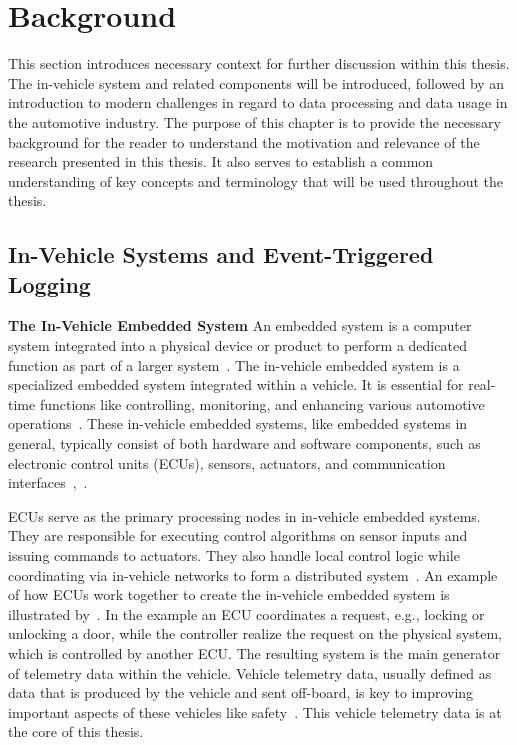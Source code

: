 \chapter{Background}
\label{chap:background}

This section introduces necessary context for further discussion within this thesis. The in-vehicle system and related components will be introduced, followed by an introduction to modern challenges in regard to data processing and data usage in the automotive industry. The purpose of this chapter is to provide the necessary background for the reader to understand the motivation and relevance of the research presented in this thesis. It also serves to establish a common understanding of key concepts and terminology that will be used throughout the thesis.

\section{In-Vehicle Systems and Event-Triggered Logging}

\textbf{The In-Vehicle Embedded System} An embedded system is a computer system integrated into a physical device or product to perform a dedicated function as part of a larger system~\cite[pp.~vii--x,~1--3]{Lee2017}. The in-vehicle embedded system is a specialized embedded system integrated within a vehicle. It is essential for real-time functions like controlling, monitoring, and enhancing various automotive operations~\cite[pp.~1-1--1-5]{Navet2009}. These in-vehicle embedded systems, like embedded systems in general, typically consist of both hardware and software components, such as electronic control units (ECUs), sensors, actuators, and communication interfaces~\cite[pp.~3--4]{Lee2017},~\cite[pp.~1-3--1-10]{Navet2009}. 

ECUs serve as the primary processing nodes in in-vehicle embedded systems. They are responsible for executing control algorithms on sensor inputs and issuing commands to actuators. They also handle local control logic while coordinating via in-vehicle networks to form a distributed system~\cite[pp.~1-8--1-19]{Navet2009}. An example of how ECUs work together to create the in-vehicle embedded system is illustrated by~\cite[pp.~1-8--1-9]{Navet2009}. In the example an ECU coordinates a request, e.g., locking or unlocking a door, while the controller realize the request on the physical system, which is controlled by another ECU\@. The resulting system is the main generator of telemetry data within the vehicle. Vehicle telemetry data, usually defined as data that is produced by the vehicle and sent off-board, is key to improving important aspects of these vehicles like safety~\cite[pp.~1--5]{MITRE2023}. This vehicle telemetry data is at the core of this thesis.

